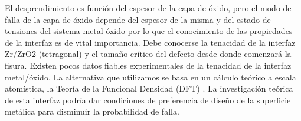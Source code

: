 El desprendimiento es función del espesor de la capa de óxido\cite{Schutze2005},
pero el modo 
de falla de la capa de óxido depende del espesor de la misma y del estado de 
tensiones del sistema metal-óxido por lo que el conocimiento de las propiedades 
de la interfaz es de vital importancia. Debe conocerse la tenacidad de la 
interfaz Zr/ZrO2 (tetragonal) y el tamaño crítico del defecto desde donde 
comenzará la fisura. Existen pocos datos fiables experimentales de la tenacidad 
de la interfaz metal/óxido. La alternativa que utilizamos se basa en un cálculo 
teórico a escala atomística, la Teoría de la Funcional Densidad (DFT) 
\cite{KohnSham65,HohenbergKohn64}. La 
investigación teórica de esta interfaz podría dar condiciones de preferencia de 
diseño de la superficie metálica para disminuir la probabilidad de falla.


